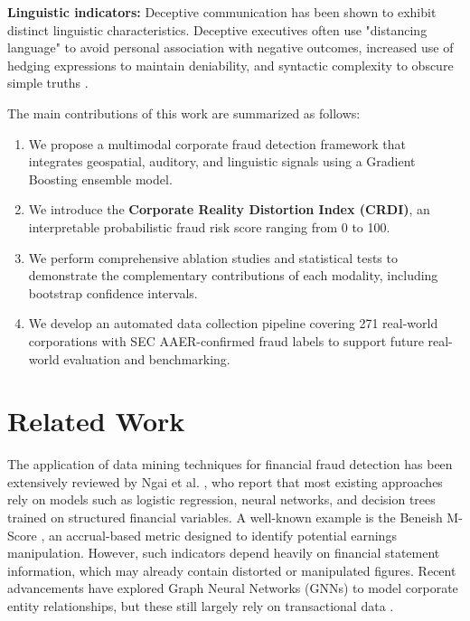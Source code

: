 \documentclass[conference]{IEEEtran}
\begin{document}
\textbf{Linguistic indicators:} Deceptive communication has been shown to
exhibit distinct linguistic characteristics. Deceptive executives often use "distancing language" to avoid personal association with negative outcomes, increased use of hedging expressions to maintain deniability, and syntactic complexity to obscure simple truths \cite{humpherys2011}.

The main contributions of this work are summarized as follows:
\begin{enumerate}
 \item We propose a multimodal corporate fraud detection framework that
 integrates geospatial, auditory, and linguistic signals using a
 Gradient Boosting ensemble model.
 \item We introduce the \textbf{Corporate Reality Distortion Index (CRDI)},
 an interpretable probabilistic fraud risk score ranging from 0 to 100.
 \item We perform comprehensive ablation studies and statistical tests to
 demonstrate the complementary contributions of each modality, including bootstrap confidence intervals.
 \item We develop an automated data collection pipeline covering
 271 real-world corporations with SEC AAER-confirmed fraud labels to
 support future real-world evaluation and benchmarking.
\end{enumerate}

\section{Related Work}

The application of data mining techniques for financial fraud detection has
been extensively reviewed by Ngai et al. \cite{ngai2011}, who report that most existing
approaches rely on models such as logistic regression, neural networks, and
decision trees trained on structured financial variables. A well-known example
is the Beneish M-Score \cite{beneish1999}, an accrual-based metric designed to identify potential
earnings manipulation. However, such indicators depend heavily on financial
statement information, which may already contain distorted or manipulated
figures. Recent advancements have explored Graph Neural Networks (GNNs) to model corporate entity relationships, but these still largely rely on transactional data \cite{li2021}.
\end{document}
